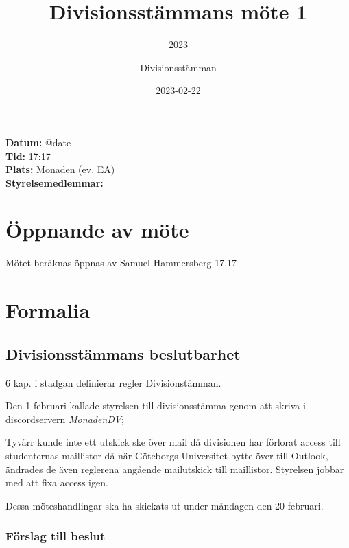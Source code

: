 \documentclass[protokoll]{dvd}
\begin{document}
\title{Divisionsstämmans möte 1}
\subtitle{2023}
\author{Divisionsstämman}
\date{2023-02-22}

\textbf{Datum:} \csname @date\endcsname\\
\textbf{Tid:} 17:17\\
\textbf{Plats:} Monaden (ev. EA)\\
\textbf{Styrelsemedlemmar:}
\begin{närvarande_förtroendevalda}
\end{närvarande_förtroendevalda}


\section{Öppnande av möte}
Mötet beräknas öppnas av Samuel Hammersberg 17.17

\section{Formalia}

\subsection{Divisionsstämmans beslutbarhet}

6 kap. i stadgan definierar regler Divisionstämman.

Den 1 februari kallade styrelsen till divisionsstämma genom att skriva i discordservern \emph{MonadenDV};

Tyvärr kunde inte ett utskick ske över mail då divisionen har förlorat
access till studenternas maillistor då när Göteborgs Universitet
bytte över till Outlook, ändrades de även reglerena angående mailutskick
till maillistor. Styrelsen jobbar med att fixa access igen.

Dessa möteshandlingar ska ha skickats ut under måndagen den 20 februari.

\subsubsection*{Förslag till beslut}
\end{document}
